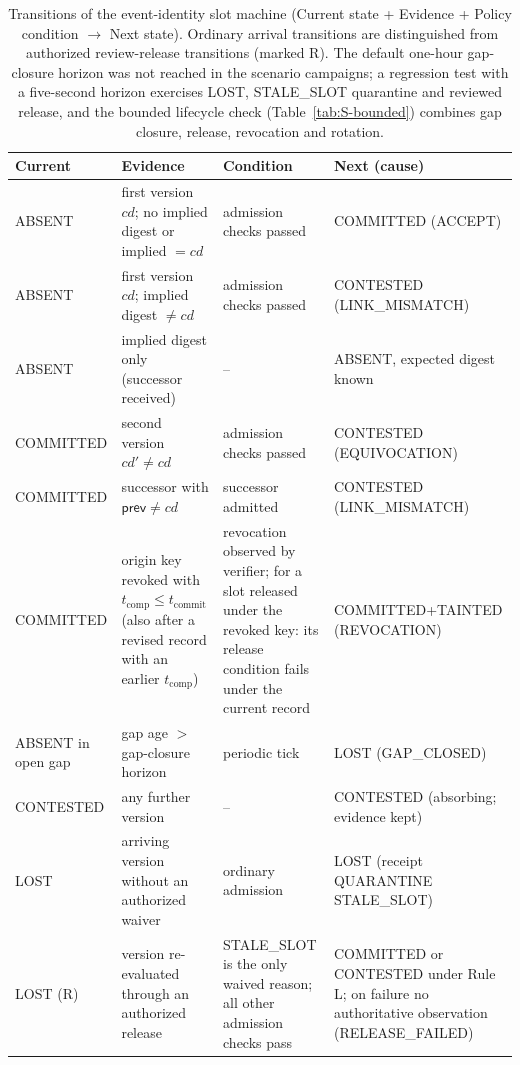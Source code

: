 \documentclass[10pt,a4paper]{article}
\begin{document}
\begin{table}[!htbp]
\caption{Transitions of the event-identity slot machine (Current state + Evidence + Policy condition $\rightarrow$ Next state). Ordinary arrival transitions are distinguished from authorized review-release transitions (marked R). The default one-hour gap-closure horizon was not reached in the scenario campaigns; a regression test with a five-second horizon exercises LOST, STALE\_SLOT quarantine and reviewed release, and the bounded lifecycle check (Table~\ref{tab:S-bounded}) combines gap closure, release, revocation and rotation.\label{tab:S-transitions}}
\footnotesize
\begin{tabularx}{\linewidth}{@{}>{\raggedright\arraybackslash}p{1.95cm}>{\raggedright\arraybackslash}X>{\raggedright\arraybackslash}X>{\raggedright\arraybackslash}X@{}}
\toprule
Current & Evidence & Condition & Next (cause)\\
\midrule
ABSENT & first version $cd$; no implied digest or implied $=cd$ & admission checks passed & COMMITTED (ACCEPT)\\
ABSENT & first version $cd$; implied digest $\neq cd$ & admission checks passed & CONTESTED (LINK\_MISMATCH)\\
ABSENT & implied digest only (successor received) & -- & ABSENT, expected digest known\\
COMMITTED & second version $cd'\neq cd$ & admission checks passed & CONTESTED (EQUIVOCATION)\\
COMMITTED & successor with $\textsf{prev}\neq cd$ & successor admitted & CONTESTED (LINK\_MISMATCH)\\
COMMITTED & origin key revoked with $t_\mathrm{comp}\le t_\mathrm{commit}$ (also after a revised record with an earlier $t_\mathrm{comp}$) & revocation observed by verifier; for a slot released under the revoked key: its release condition fails under the current record & COMMITTED+TAINTED (REVOCATION)\\
ABSENT in open gap & gap age $>$ gap-closure horizon & periodic tick & LOST (GAP\_CLOSED)\\
CONTESTED & any further version & -- & CONTESTED (absorbing; evidence kept)\\
LOST & arriving version without an authorized waiver & ordinary admission & LOST (receipt QUARANTINE STALE\_SLOT)\\
LOST (R) & version re-evaluated through an authorized release & STALE\_SLOT is the only waived reason; all other admission checks pass & COMMITTED or CONTESTED under Rule L; on failure no authoritative observation (RELEASE\_FAILED)\\

\end{tabularx}
\end{table}
\end{document}
